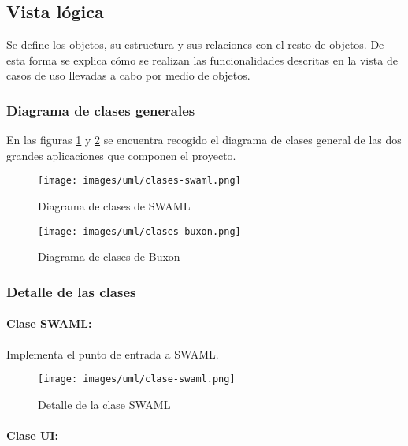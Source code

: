 
\subsection{Vista lógica}

Se define los objetos, su estructura y sus relaciones con el resto de objetos.
De esta forma se explica cómo se realizan las funcionalidades descritas en la 
vista de casos de uso llevadas a cabo por medio de objetos. 

\subsubsection{Diagrama de clases generales}

En las figuras \ref{fig:uml:swaml} y \ref{fig:uml:buxon} se encuentra recogido el
diagrama de clases general de las dos grandes aplicaciones que componen el proyecto.

\begin{figure}[p]
	\centering
 	\texttt{[image: images/uml/clases-swaml.png]}
	\caption{Diagrama de clases de SWAML}
	\label{fig:uml:swaml}
\end{figure}

\begin{figure}[p]
	\centering
 	\texttt{[image: images/uml/clases-buxon.png]}
	\caption{Diagrama de clases de Buxon}
	\label{fig:uml:buxon}
\end{figure}

\clearpage

\subsubsection{Detalle de las clases}

\paragraph{Clase SWAML:}

Implementa el punto de entrada a SWAML.

\begin{figure}[H]
	\centering
 	\texttt{[image: images/uml/clase-swaml.png]}
	\caption{Detalle de la clase SWAML}
	\label{fig:uml:swaml-class}
\end{figure}

\paragraph{Clase UI:}

